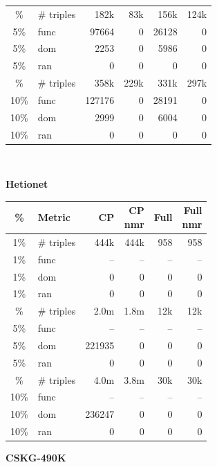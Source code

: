 \documentclass[a4paper,UKenglish,cleveref, autoref, thm-restate]{tgdk-v2021}
\begin{document}
\begin{table}[]
\begin{minipage}[t]{0.49\linewidth}
\begin{tabular}{c l | r r r r}
\addlinespace
5\% & \# triples & 182k & 83k & 156k & 124k \\
5\% & func & 97664 & 0 & 26128 & 0 \\
5\% & dom & 2253 & 0 & 5986 & 0 \\
5\% & ran & 0 & 0 & 0 & 0 \\
\addlinespace
10\% & \# triples & 358k & 229k & 331k & 297k \\
10\% & func & 127176 & 0 & 28191 & 0 \\
10\% & dom & 2999 & 0 & 6004 & 0 \\
10\% & ran & 0 & 0 & 0 & 0 \\
\bottomrule
\end{tabular}
\end{minipage}\\[2ex]

\begin{minipage}[t]{0.49\linewidth}
\centering
\textbf{Hetionet}\\
\begin{tabular}{c l | r r r r}
\toprule
\% & Metric & CP & \shortstack{CP\\nmr} & Full & \shortstack{Full\\nmr} \\
\midrule
1\%  & \# triples & 444k & 444k & 958 & 958 \\
1\%  & func      & -- & -- & -- & -- \\
1\%  & dom       & 0 & 0 & 0 & 0 \\
1\%  & ran       & 0 & 0 & 0 & 0 \\
\addlinespace
5\%  & \# triples & 2.0m & 1.8m & 12k & 12k \\
5\%  & func      & -- & -- & -- & -- \\
5\%  & dom       & 221935 & 0 & 0 & 0 \\
5\%  & ran       & 0 & 0 & 0 & 0 \\
\addlinespace
10\% & \# triples & 4.0m & 3.8m & 30k & 30k \\
10\% & func      & -- & -- & -- & -- \\
10\% & dom       & 236247 & 0 & 0 & 0 \\
10\% & ran       & 0 & 0 & 0 & 0 \\
\bottomrule
\end{tabular}
\end{minipage}%
\hfill
\begin{minipage}[t]{0.49\linewidth}
\centering
\textbf{CSKG-490K}\\

\end{minipage}
\end{table}
\end{document}
